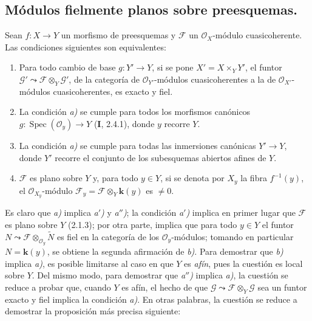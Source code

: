 \subsection{Módulos fielmente planos sobre preesquemas.}
\label{subsection:IV.2.2-fr}

\begin{proposition}[2.2.1]
\label{IV.2.2.1-fr}
Sean $f:X\to Y$ un morfismo de preesquemas y $\mathscr F$ un
$\mathcal O_X$-módulo cuasicoherente. Las condiciones siguientes son
equivalentes:
\begin{enumerate}
\item[\emph{a)}] Para todo cambio de base $g:Y'\to Y$, si se pone
$X'=X\times_Y Y'$, el funtor
$\mathscr G'\leadsto\mathscr F\otimes_Y\mathscr G'$, de la categoría de
$\mathcal O_{Y'}$-módulos cuasicoherentes a la de
$\mathcal O_{X'}$-módulos cuasicoherentes, es exacto y fiel.
\item[\emph{a$'$)}] La condición \emph{a)} se cumple para todos los
morfismos canónicos $g:\operatorname{Spec}(\mathcal O_y)\to Y$ \textup{(\textbf I, 2.4.1)},
donde $y$ recorre $Y$.
\item[\emph{a$''$)}] La condición \emph{a)} se cumple para todas las
inmersiones canónicas $Y'\to Y$, donde $Y'$ recorre el conjunto de los
subesquemas abiertos afines de $Y$.
\item[\emph{b)}] $\mathscr F$ es plano sobre $Y$ y, para todo $y\in Y$,
si se denota por $X_y$ la fibra $f^{-1}(y)$, el
$\mathcal O_{X_y}$-módulo
$\mathscr F_y=\mathscr F\otimes_Y \boldsymbol{k}(y)$ es $\neq0$.
\end{enumerate}
\end{proposition}

Es claro que \emph{a)} implica \emph{a$'$)} y \emph{a$''$)}; la condición
\emph{a$'$)} implica en primer lugar que $\mathscr F$ es plano sobre
$Y$ (2.1.3); por otra parte, implica que para todo $y\in Y$ el funtor
$N\leadsto\mathscr F\otimes_{\mathcal O_y}\widetilde N$ es fiel en la
categoría de los $\mathcal O_y$-módulos; tomando en particular $N=\boldsymbol{k}(y)$,
se obtiene la segunda afirmación de \emph{b)}. Para demostrar que \emph{b)}
implica \emph{a)}, es posible limitarse al caso en que $Y$ es \emph{afín}, pues
la cuestión es local sobre $Y$. Del mismo modo, para demostrar que
\emph{a$''$)} implica \emph{a)}, la cuestión se reduce a probar que, cuando $Y$
es afín, el hecho de que
$\mathscr G\leadsto\mathscr F\otimes_Y\mathscr G$ sea un funtor exacto y fiel
implica la condición \emph{a)}. En otras palabras, la cuestión se reduce a
demostrar la proposición más precisa siguiente:

